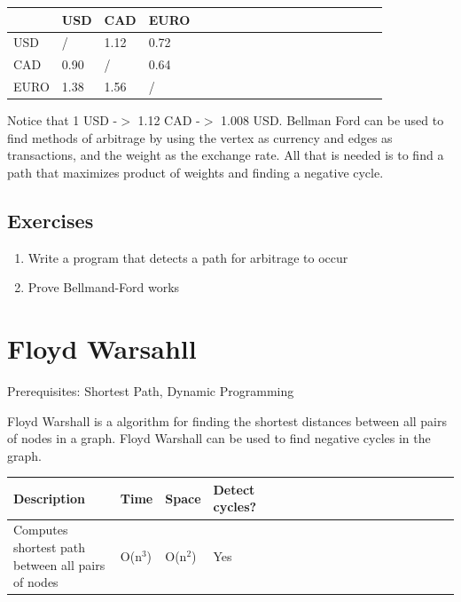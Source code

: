 \documentclass[11pt,oneside]{book}
\begin{document}
\vspace{10pt} \begin{tabulary}{0.4\linewidth}{|l|l|l|l|l|l|l|l|l|l|l|l|l|l|l|l|l|l|l}\hline


   &
  USD &
  CAD &
  EURO\\
\hline


  USD &
  / &
  1.12 &
  0.72\\

  CAD &
  0.90 &
  / &
  0.64\\

  EURO &
  1.38 &
  1.56 &
  /\\

\hline\end{tabulary}

Notice that 1 USD -$>$ 1.12 CAD -$>$ 1.008 USD. Bellman Ford can be used to find methods of arbitrage by using the vertex as currency and edges as transactions, and the weight as the exchange rate. All that is needed is to find a path that maximizes product of weights and finding a negative cycle.

\subsection{Exercises}

\begin{enumerate}
\item Write a program that detects a path for arbitrage to occur
\item Prove Bellmand-Ford works
\end{enumerate}

        \section{ Floyd Warsahll }
        

Prerequisites:  Shortest Path, Dynamic Programming

Floyd Warshall is a algorithm for finding the shortest distances between all pairs of nodes in a graph. Floyd Warshall can be used to find negative cycles in the graph.

\vspace{10pt} \begin{tabulary}{0.4\linewidth}{|l|l|l|l|l|l|l|l|l|l|l|l|l|l|l|l|l|l|l}\hline


  Description &
  Time &
  Space &
  Detect cycles?\\
\hline


  Computes shortest path between all pairs of nodes &
  O(n$^{3}$) &
  O(n$^{2}$) &
  Yes\\

\hline\end{tabulary}
\end{document}
